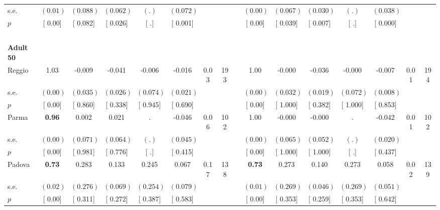 \begin{longtable}{L{8em} c c c c c c c p{1em} c c c c c c c}
\quad \quad \quad \quad s.e.& $ (     0.01)$ & $ (    0.088)$ & $ (    0.062)$ & $ (        .)$ & $ (    0.072)$ & & & & $ (     0.00)$ & $ (    0.067)$ & $ (    0.030)$ & $ (        .)$ & $ (    0.038)$ & &  \\*
\quad \quad \quad \quad $ p$ & [     0.00] & [    0.082] & [    0.026] & [        .] & [    0.001] & & & & [     0.00] & [    0.039] & [    0.007] & [        .] & [    0.000] & &  \\[1em]
~\\[1em]
\quad \quad \textbf{Adult 50} & & & & & & & & & & & & & & & \\* 
\quad \quad \quad Reggio& 1.03 &    -0.009 &    -0.041 &    -0.006 &    -0.016 &      0.03 &       193 & & 1.00 &    -0.000 &    -0.036 &    -0.000 &    -0.007 &      0.01 &       194  \\*
\quad \quad \quad \quad s.e.& $ (     0.00)$ & $ (    0.035)$ & $ (    0.026)$ & $ (    0.074)$ & $ (    0.021)$ & & & & $ (     0.00)$ & $ (    0.032)$ & $ (    0.019)$ & $ (    0.072)$ & $ (    0.008)$ & &  \\*
\quad \quad \quad \quad $ p$ & [     0.00] & [    0.860] & [    0.338] & [    0.945] & [    0.690] & & & & [     0.00] & [    1.000] & [    0.382] & [    1.000] & [    0.853] & &  \\[1em]
\quad \quad \quad Parma& \textbf{     0.96} &     0.002 &     0.021 &         . &    -0.046 &      0.06 &       102 & & 1.00 &    -0.000 &    -0.000 &         . &    -0.042 &      0.01 &       102  \\*
\quad \quad \quad \quad s.e.& $ (     0.00)$ & $ (    0.071)$ & $ (    0.064)$ & $ (        .)$ & $ (    0.045)$ & & & & $ (     0.00)$ & $ (    0.065)$ & $ (    0.052)$ & $ (        .)$ & $ (    0.020)$ & &  \\*
\quad \quad \quad \quad $ p$ & [     0.00] & [    0.981] & [    0.776] & [        .] & [    0.415] & & & & [     0.00] & [    1.000] & [    1.000] & [        .] & [    0.437] & &  \\[1em]
\quad \quad \quad Padova& \textbf{     0.73} &     0.283 &     0.133 &     0.245 &     0.067 &      0.17 &       138 & & \textbf{     0.73} &     0.273 &     0.140 &     0.273 &     0.058 &      0.02 &       139  \\*
\quad \quad \quad \quad s.e.& $ (     0.02)$ & $ (    0.276)$ & $ (    0.069)$ & $ (    0.254)$ & $ (    0.079)$ & & & & $ (     0.01)$ & $ (    0.269)$ & $ (    0.046)$ & $ (    0.269)$ & $ (    0.051)$ & &  \\*
\quad \quad \quad \quad $ p$ & [     0.00] & [    0.311] & [    0.272] & [    0.387] & [    0.583] & & & & [     0.00] & [    0.353] & [    0.259] & [    0.353] & [    0.642] & &  \\[1em]

\end{longtable}
